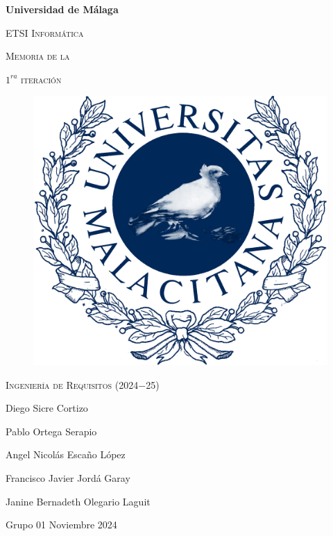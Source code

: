 \documentclass[12pt, a4paper, titlepage]{article}
\begin{document}
\begin{titlepage}
    \centering
    {\bfseries\LARGE Universidad de Málaga\par}
    \vspace{1cm}
    {\scshape\Large ETSI Informática\par}
    \vspace{2cm}
    {\scshape\Huge Memoria de la\par}
    \vspace{0.1cm}
    {\scshape\Huge $1^{ra}$ iteración}
    \vspace{2cm}
    \begin{figure}[H]
        \centering
         \includegraphics[width=0.30\linewidth]{assets/umaLogo.png}
    \end{figure}
    \vfill
    {\scshape\Large Ingeniería de Requisitos (2024$-$25)\par}
    \vfill
    {\Large Diego Sicre Cortizo\par}
    {\Large Pablo Ortega Serapio\par}
    {\Large Angel Nicolás Escaño López\par}
    {\Large Francisco Javier Jordá Garay\par}
    {\Large Janine Bernadeth Olegario Laguit\par}
    \vspace{1cm}
    {\Large Grupo 01}
    \vfill
    {\Large Noviembre 2024}
\end{titlepage}
\thispagestyle{empty}

\tableofcontents %
\thispagestyle{empty} %

\newpage

\listoffigures %
\thispagestyle{empty}

\newpage


\setcounter{page}{5} %











\end{document}
